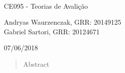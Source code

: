 \begin{titlepage}
\\

\vspace{7.5cm}


\vspace{3cm}

CE095 - Teorias de Avalição

\vspace{2cm}

Andryas Waurzenczak, GRR: 20149125 \\
Gabriel Sartori, GRR: 20124671


\vfill

07/06/2018
\end{titlepage}


\begin{abstract}
Abstract
\end{abstract}


\pagebreak
\tableofcontents
\pagebreak
